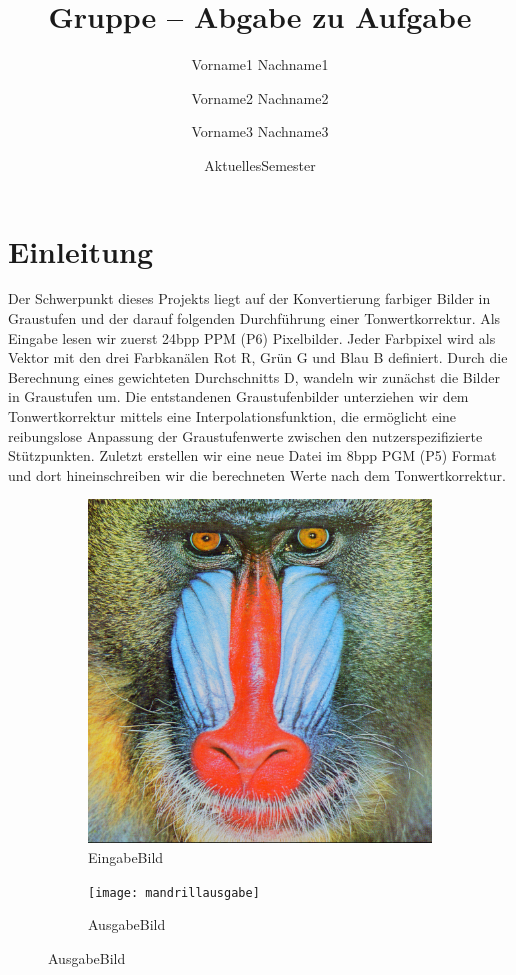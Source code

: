 \documentclass[course=erap]{aspdoc}
\author{Vorname1 Nachname1 \and Vorname2 Nachname2 \and Vorname3 Nachname3}
\date{AktuellesSemester} %
\title{Gruppe \theGroup{} -- Abgabe zu Aufgabe \theNumber}
\begin{document}
\maketitle

\section{Einleitung}
Der Schwerpunkt dieses Projekts liegt auf der Konvertierung farbiger Bilder in Graustufen und der darauf folgenden Durchführung einer Tonwertkorrektur. 
Als Eingabe lesen wir zuerst 24bpp PPM (P6) Pixelbilder. Jeder Farbpixel wird als Vektor mit den drei Farbkanälen Rot R, Grün G und Blau B definiert. Durch die Berechnung eines gewichteten Durchschnitts D, wandeln wir zunächst die Bilder in Graustufen um. Die entstandenen Graustufenbilder unterziehen wir dem Tonwertkorrektur mittels eine Interpolationsfunktion, die ermöglicht eine reibungslose Anpassung der Graustufenwerte zwischen den nutzerspezifizierte Stützpunkten. 
Zuletzt erstellen wir eine neue Datei im 8bpp PGM (P5) Format und dort hineinschreiben wir die berechneten Werte nach dem Tonwertkorrektur.

\begin{figure}[h]
    \begin{subfigure}{0.5\linewidth}
      \centering
      \includegraphics[width=\linewidth]{mandrill-2}
      \caption{EingabeBild}
      \label{fig:eingabe}
    \end{subfigure}%
    \begin{subfigure}{0.5\linewidth}
      \centering
      \texttt{[image: mandrillausgabe]}
      \caption{AusgabeBild}
      \label{fig:ausgabe}
    \end{subfigure}
\end{figure}
\end{document}
